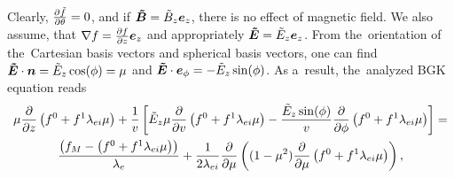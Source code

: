 \documentclass[preprint,12pt]{elsarticle}
\newcounter{bla}
\begin{document}
Clearly, $\frac{\partial{\tilde{f}}}{\partial{\theta}} = 0$, and if $\boldsymbol{\tilde{B}} = \tilde{B}_z\boldsymbol{e}_z$, 
there is no effect of magnetic field. We also assume, that 
$\nabla f = \frac{\partial{f}}{\partial{z}}\boldsymbol{e}_z$ and appropriately 
$\boldsymbol{\tilde{E}} = \tilde{E}_z\boldsymbol{e}_z$.
From the~orientation of the~Cartesian basis vectors and spherical 
basis vectors, one can find $\boldsymbol{\tilde{E}}\cdot\boldsymbol{n} = \tilde{E}_z \cos(\phi) = \mu$ and
$\boldsymbol{\tilde{E}}\cdot\boldsymbol{e}_\phi = -\tilde{E}_z\sin(\phi)$. As a~result, the~analyzed
BGK equation reads
\begin{multline}
  \mu\frac{\partial{}}{\partial{z}}\left( f^0 + f^1 \lambda_{ei}\mu \right) 
  + \frac{1}{v} \left[ \tilde{E}_z\mu \frac{\partial{}}{\partial{v}} 
  \left( f^0 + f^1 \lambda_{ei}\mu \right) 
  - \frac{\tilde{E}_z\sin(\phi)}{v}\frac{\partial{}}{\partial{\phi}} 
  \left( f^0 + f^1 \lambda_{ei}\mu \right)
  \right] 
  =\\
  \frac{\left(f_M - \left( f^0 + f^1 \lambda_{ei}\mu \right) \right)}{\lambda_e} 
  + \frac{1}{2 \lambda_{ei}}\frac{\partial{}}{\partial{\mu}}\left((1 - \mu^2)
  \frac{\partial{}}{\partial{\mu}}\left( f^0 + f^1 \lambda_{ei}\mu \right) \right) ,
  \label{eq:BGK_spherical}
\end{multline}
\end{document}

